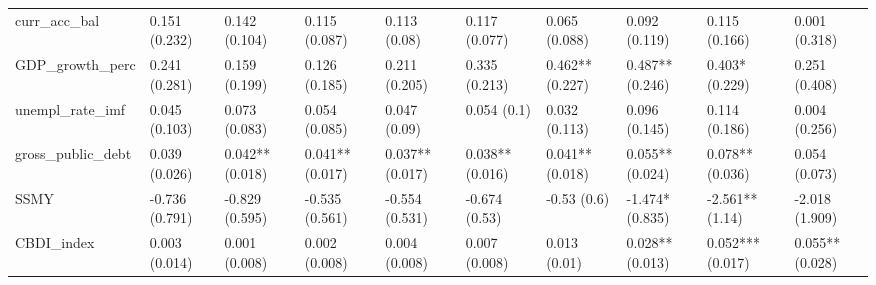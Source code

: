 \begin{table}[ht]
\begin{tabular}{llllllllll}
  curr\_acc\_bal & 0.151 (0.232) & 0.142 (0.104) & 0.115 (0.087) & 0.113 (0.08) & 0.117 (0.077) & 0.065 (0.088) & 0.092 (0.119) & 0.115 (0.166) & 0.001 (0.318) \\ 
  GDP\_growth\_perc & 0.241 (0.281) & 0.159 (0.199) & 0.126 (0.185) & 0.211 (0.205) & 0.335 (0.213) & 0.462** (0.227) & 0.487** (0.246) & 0.403* (0.229) & 0.251 (0.408) \\ 
  unempl\_rate\_imf & 0.045 (0.103) & 0.073 (0.083) & 0.054 (0.085) & 0.047 (0.09) & 0.054 (0.1) & 0.032 (0.113) & 0.096 (0.145) & 0.114 (0.186) & 0.004 (0.256) \\ 
  gross\_public\_debt & 0.039 (0.026) & 0.042** (0.018) & 0.041** (0.017) & 0.037** (0.017) & 0.038** (0.016) & 0.041** (0.018) & 0.055** (0.024) & 0.078** (0.036) & 0.054 (0.073) \\ 
  SSMY & -0.736 (0.791) & -0.829 (0.595) & -0.535 (0.561) & -0.554 (0.531) & -0.674 (0.53) & -0.53 (0.6) & -1.474* (0.835) & -2.561** (1.14) & -2.018 (1.909) \\ 
  CBDI\_index & 0.003 (0.014) & 0.001 (0.008) & 0.002 (0.008) & 0.004 (0.008) & 0.007 (0.008) & 0.013 (0.01) & 0.028** (0.013) & 0.052*** (0.017) & 0.055** (0.028) \\ 
   \bottomrule
\end{tabular}
\endgroup
\end{table}
